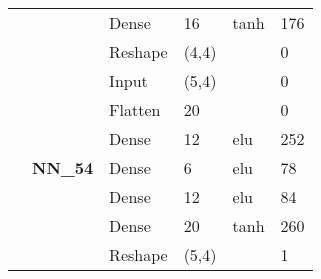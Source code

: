 \begin{table}[H]
\begin{center}
\begin{tabular}{ll|l|l|l|l|}
\multicolumn{1}{|l|}{}                                                                        &                                  & Dense                              & 16                                   & tanh                                     & 176                                         \\ \cline{3-6} 
\multicolumn{1}{|l|}{}                                                                        &                                  & Reshape                            & (4,4)                                &                                          & 0                                           \\ \cline{2-6} 
\multicolumn{1}{|l|}{}                                                                        & \multirow{7}{*}{\textbf{NN\_54}} & Input                              & (5,4)                                &                                          & 0                                           \\ \cline{3-6} 
\multicolumn{1}{|l|}{}                                                                        &                                  & Flatten                            & 20                                   &                                          & 0                                           \\ \cline{3-6} 
\multicolumn{1}{|l|}{}                                                                        &                                  & Dense                              & 12                                   & elu                                     & 252                                         \\ \cline{3-6} 
\multicolumn{1}{|l|}{}                                                                        &                                  & Dense                              & 6                                    & elu                                     & 78                                          \\ \cline{3-6} 
\multicolumn{1}{|l|}{}                                                                        &                                  & Dense                              & 12                                   & elu                                     & 84                                          \\ \cline{3-6} 
\multicolumn{1}{|l|}{}                                                                        &                                  & Dense                              & 20                                   & tanh                                     & 260                                         \\ \cline{3-6} 
\multicolumn{1}{|l|}{}                                                                        &                                  & Reshape                            & (5,4)                                &                                          & 1                                           \\ \hline
\end{tabular}


\end{center}
\end{table}
